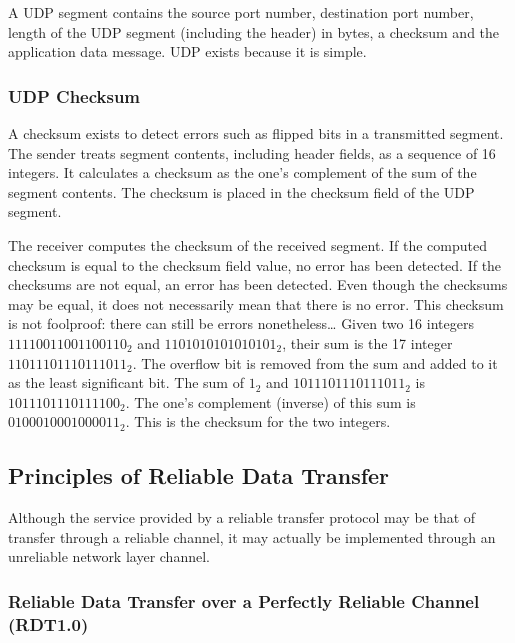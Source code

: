 A UDP segment contains the source port number, destination port number, length of the UDP segment (including the header) in bytes, a checksum and the application data message.
UDP exists because it is simple.


\subsubsection{UDP Checksum}

A checksum exists to detect errors such as flipped bits in a transmitted segment.
The sender treats segment contents, including header fields, as a sequence of \SI{16}{\bit} integers.
It calculates a checksum as the one's complement of the sum of the segment contents.
The checksum is placed in the checksum field of the UDP segment.

The receiver computes the checksum of the received segment.
If the computed checksum is equal to the checksum field value, no error has been detected.
If the checksums are not equal, an error has been detected.
Even though the checksums may be equal, it does not necessarily mean that there is no error.
\newline
This checksum is not foolproof: there can still be errors nonetheless…
\newline
Given two \SI{16}{\bit} integers \(11110011001100110_2\) and \(1101010101010101_2\), their sum is the \SI{17}{\bit} integer \(11011101110111011_2\).
The overflow bit is removed from the sum and added to it as the least significant bit.
The sum of \(1_2\) and \(1011101110111011_2\) is \(1011101110111100_2\).
The one's complement (inverse) of this sum is \(0100010001000011_2\).
This is the checksum for the two integers.

\subsection{Principles of Reliable Data Transfer}

Although the service provided by a reliable transfer protocol may be that of transfer through a reliable channel, it may actually be implemented through an unreliable network layer channel.

\subsubsection[RDT over a Perfectly Reliable Channel (RDT1.0)]{Reliable Data Transfer over a Perfectly Reliable Channel (RDT1.0)}

